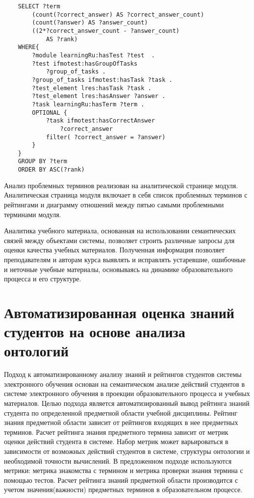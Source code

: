 \begin{verbatim}
    SELECT ?term 
        (count(?correct_answer) AS ?correct_answer_count)
        (count(?answer) AS ?answer_count)
        ((2*?correct_answer_count - ?answer_count) 
            AS ?rank) 
    WHERE{
        ?module learningRu:hasTest ?test  . 
        ?test ifmotest:hasGroupOfTasks 
            ?group_of_tasks .        
        ?group_of_tasks ifmotest:hasTask ?task .      
        ?test_element lres:hasTask ?task .
        ?test_element lres:hasAnswer ?answer .
        ?task learningRu:hasTerm ?term .       
        OPTIONAL { 
            ?task ifmotest:hasCorrectAnswer 
                ?correct_answer
            filter( ?correct_answer = ?answer)
        }         
    }
    GROUP BY ?term 
    ORDER BY ASC(?rank)
\end{verbatim}

Анализ проблемных терминов реализован на аналитической странице модуля. Аналитическая страница модуля включает в себя список проблемных терминов с рейтингами и диаграмму отношений между пятью самыми проблемными терминами модуля.

Аналитика учебного материала, основанная на использовании семантических связей между объектами системы, позволяет строить различные запросы для оценки качества учебных материалов. Полученная информация позволяет преподавателям и авторам курса выявлять и исправлять устаревшие, ошибочные и неточные учебные материалы, основываясь на динамике образовательного процесса и его структуре.



\section{Автоматизированная оценка знаний студентов на основе анализа онтологий} \label{sect3_5}

Подход к автоматизированному анализу знаний и рейтингов студентов системы электронного обучения основан на семантическом анализе действий студентов в системе электронного обучения в проекции образовательного процесса и учебных материалов. Целью подхода является автоматизированный вывод рейтинга знаний студента по определенной предметной области учебной дисциплины. Рейтинг знания предметной области зависит от рейтингов входящих в нее предметных терминов. Расчет рейтинга знания предметного термина зависит от метрик оценки действий студента в системе. Набор метрик может варьироваться в зависимости от возможных действий студентов в системе, структуры онтологии и необходимой точности вычислений. В предложенном подходе используются метрики: метрика знакомства с термином и метрика проверки знания термина с помощью тестов. Расчет рейтинга знаний предметной области производится с учетом значения(важности) предметных терминов в образовательном процессе.

